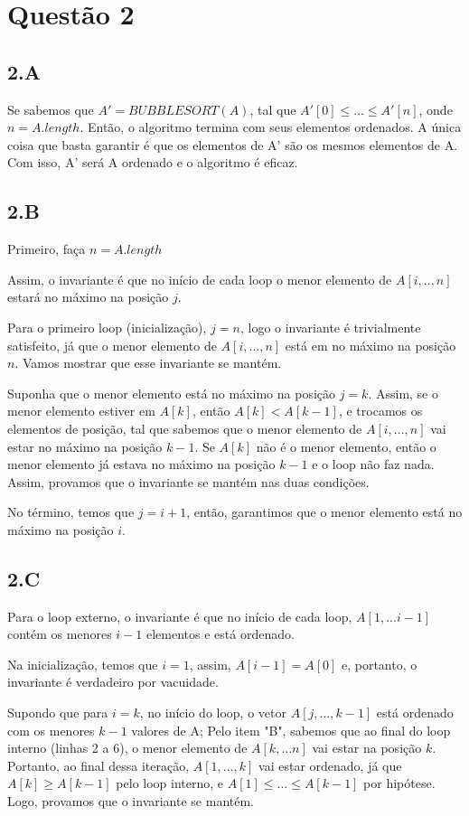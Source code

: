 \documentclass{article}
\begin{document}
\section*{Questão 2}
\subsection*{2.A}
Se sabemos que $A' = BUBBLESORT(A)$, tal que $A'[0]\leq...\leq A'[n]$, onde $n=A.length$. Então, o algoritmo
termina com seus elementos ordenados. A única coisa que basta garantir é que os elementos de A' são os 
mesmos elementos de A. Com isso, A' será A ordenado e o algoritmo é eficaz.
\subsection*{2.B}
Primeiro, faça $n = A.length$

Assim, o invariante é que no início de cada loop o menor elemento de $A[i,..,n]$ estará no
máximo na posição $j$.

Para o primeiro loop (inicialização), $j=n$, logo o invariante é trivialmente satisfeito, já que o menor
elemento de $A[i,...,n]$ está em no máximo na posição $n$. Vamos mostrar que esse invariante se mantém.

Suponha que o menor elemento está no máximo na posição $j=k$. Assim, se o menor elemento estiver em $A[k]$, então
$A[k]<A[k-1]$, e trocamos os elementos de posição, tal que sabemos que o menor elemento de $A[i,...,n]$ vai estar
no máximo na posição $k-1$. Se $A[k]$ não é o menor elemento, então o menor elemento já estava no máximo na posição
$k-1$ e o loop não faz nada. Assim, provamos que o invariante se mantém nas duas condições.

No término, temos que $j=i+1$, então, garantimos que o menor elemento está no máximo na posição $i$.
\subsection*{2.C}
Para o loop externo, o invariante é que no início de cada loop, $A[1,...i-1]$ contém os menores $i-1$ elementos
e está ordenado.

Na inicialização, temos que $i=1$, assim, $A[i-1]=A[0]$ e, portanto, o invariante é verdadeiro por vacuidade.

Supondo que para $i=k$, no início do loop, o vetor $A[j,...,k-1]$ está ordenado com os menores $k-1$ valores de A;
Pelo item "B", sabemos que ao final do loop interno (linhas 2 a 6), o menor elemento de $A[k,...n]$ vai estar na posição $k$.
Portanto, ao final dessa iteração, $A[1,...,k]$ vai estar ordenado, já que $A[k]\geq A[k-1]$ pelo loop interno, e 
$A[1]\leq...\leq A[k-1]$ por hipótese. Logo, provamos que o invariante se mantém.
\end{document}
